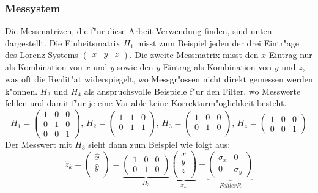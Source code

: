 \begin{refsection}
\subsubsection{Messystem}
Die Messmatrizen, die f"ur diese Arbeit Verwendung finden, sind unten dargestellt. Die Einheitsmatrix $H_{1}$ misst zum Beispiel jeden der drei Eintr"age des Lorenz Systems $\begin{pmatrix}x & y & z
\end{pmatrix}$. Die zweite Messmatrix misst den $x$-Eintrag nur als Kombination von $x$ und $y$ sowie den $y$-Eintrag als Kombination von $y$ und $z$, was oft die Realit"at widerspiegelt, wo Messgr"ossen nicht direkt gemessen werden k"onnen. $H_{3}$ und $H_{4}$ als anspruchsvolle Beispiele f"ur den Filter, wo Messwerte fehlen und damit f"ur je eine Variable keine Korrekturm"oglichkeit besteht.
\[H_{1}=\begin{pmatrix}
1 & 0 & 0 \\ 
0 & 1 & 0 \\ 
0 & 0 & 1
\end{pmatrix} 
\text{, }
H_{2}=\begin{pmatrix}
1 & 1 & 0 \\ 
0 & 1 & 1 \\ 
\end{pmatrix}
\text{, }
H_{3}=\begin{pmatrix}
1 & 0 & 0 \\ 
0 & 1 & 0 \\ 
\end{pmatrix}
\text{, }
H_{4}=\begin{pmatrix}
1 & 0 & 0 \\  
0 & 0 & 1
\end{pmatrix}
\]
Der Messwert mit $H_{3}$ sieht dann zum Beispiel wie folgt aus:
\[\hat{z}_{k}=
\begin{pmatrix}
\hat{x} \\
\hat{y} \\
\end{pmatrix}= 
\underbrace{\begin{pmatrix}
1 & 0 & 0  \\
0 & 1 & 0
\end{pmatrix}}_{H_{3}}
\underbrace{\begin{pmatrix}
x \\
y \\
z \\
\end{pmatrix}
}_{x_{k}}
+
\underbrace{\begin{pmatrix}
\sigma_{x} & 0 \\
0 & \sigma_{y}
\end{pmatrix}}_{Fehler R}
\]


\end{refsection}
